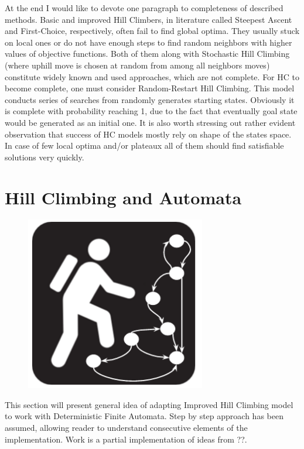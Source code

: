 \documentclass{mini}
\begin{document}
At the end I would like to devote one paragraph to completeness of described methods. Basic and improved Hill Climbers, in literature called Steepest Ascent and First-Choice, respectively, often fail to find global optima. They usually stuck on local ones or do not have enough steps to find random neighbors with higher values of objective functions. Both of them along with Stochastic Hill Climbing (where uphill move is chosen at random from among all neighbors moves) constitute widely known and used approaches, which are not complete. For HC to become complete, one must consider Random-Restart Hill Climbing. This model conducts series of searches from randomly generates starting states. Obviously it is complete with probability reaching 1, due to the fact that eventually goal state would be generated as an initial one. It is also worth stressing out rather evident observation that success of HC models mostly rely on shape of the states space. In case of few local optima and/or plateaux all of them should find satisfiable solutions very quickly. 


\section{Hill Climbing and Automata} \label{sec:hc_automata__}

\begin{figure}
  \begin{center}
    \includegraphics[width=0.7\textwidth]{./images/hc_auto_1.png}
  \end{center}
\end{figure}
This section will present general idea of adapting Improved Hill Climbing model to work with Deterministic Finite Automata. Step by step approach has been assumed, allowing reader to understand consecutive elements of the implementation. Work is a partial implementation of ideas from ??.
\end{document}

